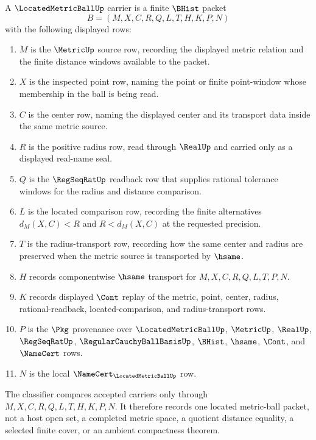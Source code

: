 \begin{definition}
\label{def:located-metric-ball-carrier}
A $\LocatedMetricBallUp$ carrier is a finite $\BHist$ packet
$$
B=(M,X,C,R,Q,L,T,H,K,P,N)
$$
with the following displayed rows:
\begin{enumerate}
\item $M$ is the $\MetricUp$ source row, recording the displayed metric relation and the finite distance windows available to the packet.
\item $X$ is the inspected point row, naming the point or finite point-window whose membership in the ball is being read.
\item $C$ is the center row, naming the displayed center and its transport data inside the same metric source.
\item $R$ is the positive radius row, read through $\RealUp$ and carried only as a displayed real-name seal.
\item $Q$ is the $\RegSeqRatUp$ readback row that supplies rational tolerance windows for the radius and distance comparison.
\item $L$ is the located comparison row, recording the finite alternatives $d_M(X,C)<R$ and $R<d_M(X,C)$ at the requested precision.
\item $T$ is the radius-transport row, recording how the same center and radius are preserved when the metric source is transported by $\hsame$.
\item $H$ records componentwise $\hsame$ transport for $M,X,C,R,Q,L,T,P,N$.
\item $K$ records displayed $\Cont$ replay of the metric, point, center, radius, rational-readback, located-comparison, and radius-transport rows.
\item $P$ is the $\Pkg$ provenance over $\LocatedMetricBallUp$, $\MetricUp$, $\RealUp$, $\RegSeqRatUp$, $\RegularCauchyBallBasisUp$, $\BHist$, $\hsame$, $\Cont$, and $\NameCert$ rows.
\item $N$ is the local $\NameCert_{\LocatedMetricBallUp}$ row.
\end{enumerate}
The classifier compares accepted carriers only through $M,X,C,R,Q,L,T,H,K,P,N$. It therefore records one located metric-ball packet, not a host open set, a completed metric space, a quotient distance equality, a selected finite cover, or an ambient compactness theorem.
\end{definition}

